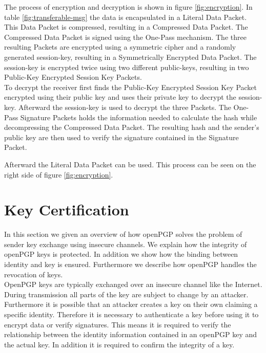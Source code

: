 The process of encryption and decryption is shown in figure \ref{fig:encryption}. In table \ref{fig:transferable-msg} the data is encapsulated in a Literal Data Packet. This Data Packet is compressed, resulting in a Compressed Data Packet. The Compressed Data Packet is signed using the One-Pass mechanism. The three resulting Packets are encrypted using a symmetric cipher and a randomly generated session-key, resulting in a Symmetrically Encrypted Data Packet. The session-key is encrypted twice using two different public-keys, resulting in two Public-Key Encrypted Session Key Packets. \\


To decrypt the receiver first finds the Public-Key Encrypted Session Key Packet encrypted using their public key and uses their private key to decrypt the session-key. Afterward the session-key is used to decrypt the three Packets. The One-Pass Signature Packets holds the information needed to calculate the hash while decompressing the Compressed Data Packet. The resulting hash and the sender's public key are then used to verify the signature contained in the Signature Packet. 

Afterward the Literal Data Packet can be used. This process can be seen on the right side of figure \ref{fig:encryption}.

\section{Key Certification}

In this section we given an overview of how openPGP solves the problem of sender key exchange using insecure channels. We explain how the integrity of openPGP keys is protected. In addition we show how the binding between identity and key is ensured. Furthermore we describe how openPGP handles the revocation of keys. \\

OpenPGP keys are typically exchanged over an insecure channel like the Internet. During transmission all parts of the key are subject to change by an attacker. Furthermore it is possible that an attacker creates a key on their own claiming a specific identity. Therefore it is necessary to authenticate a key before using it to encrypt data or verify signatures.
This means it is required to verify the relationship between the identity information contained in an openPGP key and the actual key. In addition it is required to confirm the integrity of a key. \\

